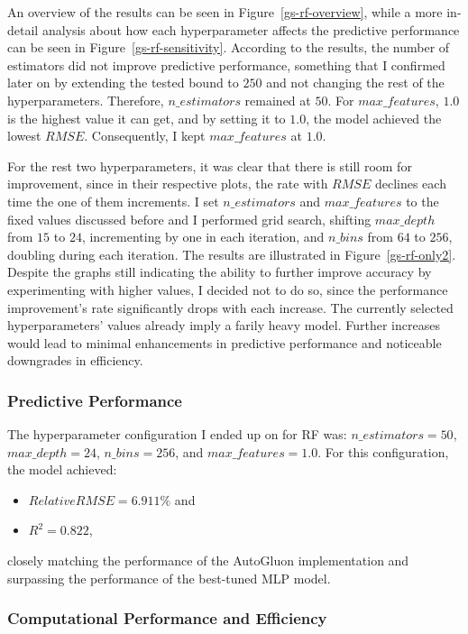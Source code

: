 An overview of the results can be seen in Figure~\ref{gs-rf-overview}, while a more in-detail analysis about how each hyperparameter affects the predictive performance can be seen in Figure~\ref{gs-rf-sensitivity}. According to the results, the number of estimators did not improve predictive performance, something that I confirmed later on by extending the tested bound to $250$ and not changing the rest of the hyperparameters. Therefore, $n\_estimators$ remained at $50$. For $max\_features$, $1.0$ is the highest value it can get, and by setting it to $1.0$, the model achieved the lowest $RMSE$. Consequently, I kept $max\_features$ at $1.0$.

 For the rest two hyperparameters, it was clear that there is still room for improvement, since in their respective plots, the rate with $RMSE$ declines each time the one of them increments. I set $n\_estimators$ and $max\_features$ to the fixed values discussed before and I performed grid search, shifting $max\_depth$ from $15$ to $24$, incrementing by one in each iteration, and $n\_bins$ from $64$ to $256$, doubling during each iteration. The results are illustrated in Figure~\ref{gs-rf-only2}. Despite the graphs still indicating the ability to further improve accuracy by experimenting with higher values, I decided not to do so, since the performance improvement's rate significantly drops with each increase. The currently selected hyperparameters' values already imply a farily heavy model. Further increases would lead to minimal enhancements in predictive performance and noticeable downgrades in efficiency.


\subsubsection{Predictive Performance}

The hyperparameter configuration I ended up on for RF was: $n\_estimators = 50$, $max\_depth = 24$, $n\_bins=256$, and $max\_features=1.0$. For this configuration, the model achieved:

\begin{itemize}
    \item $RelativeRMSE = 6.911\%$ and
    \item $R^2 = 0.822$,
\end{itemize}

closely matching the performance of the AutoGluon implementation and surpassing the performance of the best-tuned MLP model.

\subsubsection{Computational Performance and Efficiency}


